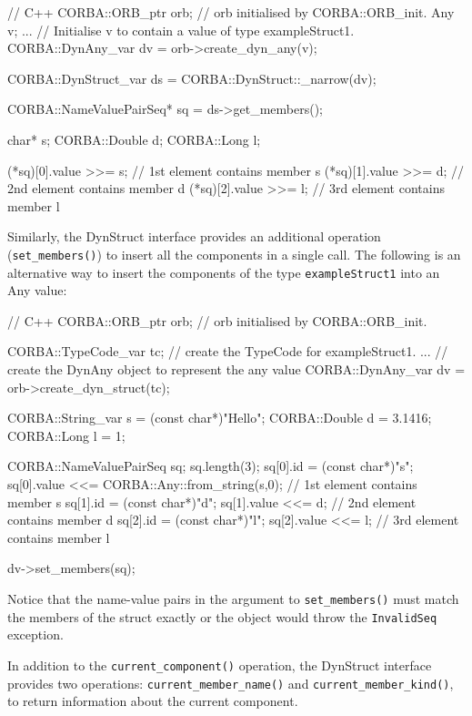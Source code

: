 \documentclass[11pt,twoside,a4paper]{book}
\newcommand{\type}[1]{\texttt{#1}}
\newcommand{\code}[1]{\texttt{#1}}
\newcommand{\op}[1]{\texttt{#1()}}
\newcommand{\dsc}{\discretionary{}{}{}}
\begin{document}
\begin{cxxlisting}
// C++
CORBA::ORB_ptr orb;  // orb initialised by CORBA::ORB_init.
Any v;
...       // Initialise v to contain a value of type exampleStruct1.
CORBA::DynAny_var dv = orb->create_dyn_any(v);
  
CORBA::DynStruct_var ds = CORBA::DynStruct::_narrow(dv);
  
CORBA::NameValuePairSeq* sq = ds->get_members();
  
char*         s;
CORBA::Double d;
CORBA::Long   l;
  
(*sq)[0].value >>= s;        // 1st element contains member s
(*sq)[1].value >>= d;        // 2nd element contains member d
(*sq)[2].value >>= l;        // 3rd element contains member l
\end{cxxlisting}


Similarly, the DynStruct interface provides an additional operation
(\op{set\_members}) to insert all the components in a single call. The
following is an alternative way to insert the components of the type
\type{exampleStruct1} into an Any value:

\begin{cxxlisting}
// C++
CORBA::ORB_ptr orb;  // orb initialised by CORBA::ORB_init.
  
CORBA::TypeCode_var tc;
// create the TypeCode for exampleStruct1.
...
// create the DynAny object to represent the any value
CORBA::DynAny_var dv = orb->create_dyn_struct(tc);
  
CORBA::String_var s = (const char*)"Hello";
CORBA::Double     d = 3.1416;
CORBA::Long       l = 1;
  
CORBA::NameValuePairSeq sq;
sq.length(3);
sq[0].id = (const char*)"s";
sq[0].value <<= CORBA::Any::from_string(s,0); 
                               // 1st element contains member s
sq[1].id = (const char*)"d";
sq[1].value <<= d;             // 2nd element contains member d
sq[2].id = (const char*)"l";
sq[2].value <<= l;             // 3rd element contains member l
  
dv->set_members(sq);    
\end{cxxlisting}

Notice that the name-value pairs in the argument to \op{set\_members}
must match the members of the struct exactly or the object would throw
the \code{InvalidSeq} exception.

In addition to the \op{current\_component} operation, the DynStruct
interface provides two operations: \op{current\_member\_name} and
\op{current\_member\_\dsc{}kind}, to return information about the
current component.
\end{document}
